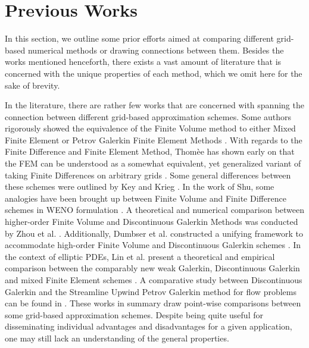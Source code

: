\documentclass[asi,article,submit,moreauthors]{Definitions/mdpi}
\begin{document}
\section{Previous Works}

In this section, we outline some prior efforts aimed at comparing different grid-based numerical methods or drawing connections between them.
Besides the works mentioned henceforth, there exists a vast amount of literature that is concerned with the unique properties of each method, which we omit here for the sake of brevity.

In the literature, there are rather few works that are concerned with spanning the connection between different grid-based approximation schemes.
Some authors rigorously showed the equivalence of the Finite Volume method to either Mixed Finite Element \cite{barangerConnectionFiniteVolume1996} or Petrov Galerkin Finite Element Methods \cite{yeRelationshipFiniteVolume2001,idelsohnFiniteVolumesFinite1994}.
With regards to the Finite Difference and Finite Element Method, Thomèe has shown early on that the FEM can be understood as a somewhat equivalent, yet generalized variant of taking Finite Differences on arbitrary grids \cite{thomeeFiniteDifferenceFinite1984}.
Some general differences between these schemes were outlined by Key and Krieg \cite{keyComparisonFiniteElementFiniteDifference1973}.
In the work of Shu, some analogies have been brought up between Finite Volume and Finite Difference schemes in WENO formulation \cite{shuHighorderFiniteDifference2003}.
A theoretical and numerical comparison between higher-order Finite Volume and Discontinuous Galerkin Methods was conducted by Zhou et al. \cite{zhouNumericalComparisonWENO2001}.
Additionally, Dumbser et al. constructed a unifying framework to accommodate high-order Finite Volume and Discontinuous Galerkin schemes \cite{dumbserUnifiedFrameworkConstruction2008a}.
In the context of elliptic PDEs, Lin et al. present a theoretical and empirical comparison between the comparably new weak Galerkin, Discontinuous Galerkin and mixed Finite Element schemes \cite{linComparativeStudyWeak2015a}.
A comparative study between Discontinuous Galerkin and the Streamline Upwind Petrov Galerkin method for flow problems can be found in \cite{yurunComparativeStudyDiscontinuous1997}.
These works in summary draw point-wise comparisons between some grid-based approximation schemes.
Despite being quite useful for disseminating individual advantages and disadvantages for a given application, one may still lack an understanding of the general properties.
\end{document}
